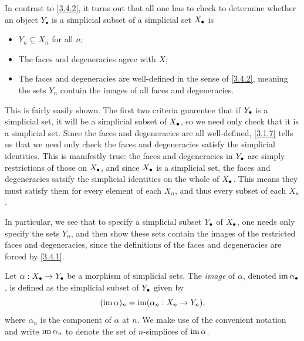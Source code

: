 \begin{remark}\label{3.4.3}
    In contrast to \cref{3.4.2}, it turns out that all one has to check to determine whether an object $Y_\bullet$ is a simplicial subset of a simplicial set $X_\bullet$ is
    \begin{itemize}
        \item $Y_n\subseteq X_n$ for all $n$;
        \item The faces and degeneracies agree with $X$;
        \item The faces and degeneracies are well-defined in the sense of \cref{3.4.2}, meaning the sets $Y_n$ contain the images of all faces and degeneracies.
    \end{itemize}
    This is fairly easily shown. The first two criteria guarentee that if $Y_\bullet$ is a simplicial set, it will be a simplicial subset of $X_\bullet$, so we need only check that it is a simplicial set. Since the faces and degeneracies are all well-defined, \cref{3.1.7} tells us that we need only check the faces and degeneracies satisfy the simplicial identities. This is manifestly true: the faces and degeneracies in $Y_\bullet$ are simply restrictions of those on $X_\bullet$, and since $X_\bullet$ is a simplicial set, the faces and degeneracies satsify the simplicial identities on the whole of $X_\bullet$. This means they must satisfy them for every element of each $X_n$, and thus every subset of each $X_n$.

    In particular, we see that to specify a simplicial subset $Y_\bullet$ of $X_\bullet$, one needs only specify the sets $Y_n$, and then show these sets contain the images of the restricted faces and degeneracies, since the definitions of the faces and degeneracies are forced by \cref{3.4.1}.
\end{remark}

\begin{definition}\label{3.4.4}
    Let $\alpha : X_\bullet\to Y_\bullet$ be a morphism of simplicial sets. The \emph{image} of $\alpha$, denoted $\operatorname{im}\alpha_\bullet$, is defined as the simplicial subset of $Y_\bullet$ given by
    \[
    (\operatorname{im}\alpha)_n=\operatorname{im}(\alpha_n : X_n\to Y_n),
    \]
    where $\alpha_n$ is the component of $\alpha$ at $n$. We make use of the convenient notation and write $\operatorname{im}\alpha_n$ to denote the set of $n$-simplices of $\operatorname{im}\alpha$.
\end{definition}

